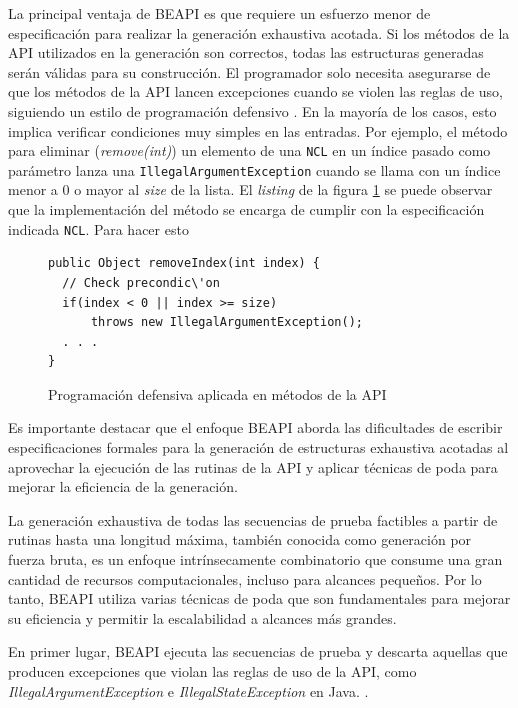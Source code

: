 La principal ventaja de \textsf{BEAPI} es que requiere un esfuerzo menor de especificación para realizar la generación exhaustiva acotada. Si los métodos de la API utilizados en la generación son correctos, todas las estructuras generadas serán válidas para su construcción. El programador solo necesita asegurarse de que los métodos de la API lancen excepciones cuando se violen las reglas de uso, siguiendo un estilo de programación defensivo \cite{Liskov00}. En la mayoría de los casos, esto implica verificar condiciones muy simples en las entradas. Por ejemplo, el método para eliminar (\emph{remove(int)}) un elemento de una \texttt{NCL} en un índice pasado como parámetro lanza una \texttt{IllegalArgumentException} cuando se llama con un índice menor a 0 o mayor al \emph{size} de la lista. El \emph{listing} de la figura \ref{fig:algoProgDefensiva}  se puede observar que la implementación del método se encarga de cumplir con la especificación indicada \texttt{NCL}.
Para hacer esto


\begin{figure}[!thb]
\begin{lstlisting}
public Object removeIndex(int index) {
  // Check precondic\'on
  if(index < 0 || index >= size)
      throws new IllegalArgumentException();  
  . . .
}

\end{lstlisting}
\caption{Programación defensiva aplicada en métodos de la API}
\label{fig:algoProgDefensiva}
\end{figure}


Es importante destacar que el enfoque \textsf{BEAPI} aborda las dificultades de escribir especificaciones formales para la generación de estructuras exhaustiva acotadas al aprovechar la ejecución de las rutinas de la API y aplicar técnicas de poda para mejorar la eficiencia de la generación.

 La generación exhaustiva de todas las secuencias de prueba factibles a partir de rutinas hasta una longitud máxima, también conocida como generación por fuerza bruta, es un enfoque intrínsecamente combinatorio que consume una gran cantidad de recursos computacionales, incluso para alcances pequeños. Por lo tanto, \textsf{BEAPI} utiliza varias técnicas de poda que son fundamentales para mejorar su eficiencia y permitir la escalabilidad a alcances más grandes.

En primer lugar, \textsf{BEAPI} ejecuta las secuencias de prueba y descarta
aquellas que producen excepciones que violan las reglas de uso de la API, como
\emph{IllegalArgumentException} e \emph{IllegalStateException} en Java.
.

